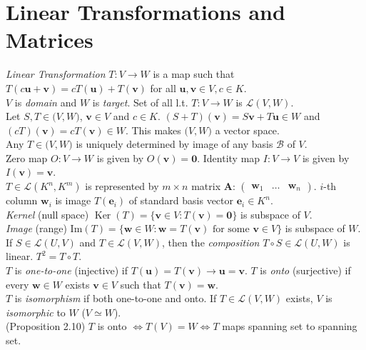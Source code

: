 \documentclass{article}
\theoremstyle{definition}
\DeclareMathOperator{\Ker}{Ker}
\renewcommand{\Im}{\text{Im}}
\begin{document}
\section{Linear Transformations and Matrices}
\textit{Linear Transformation} $T:V\rightarrow W$ is a map such that $T(c\mathbf{u}+\mathbf{v})=cT(\mathbf{u})+T(\mathbf{v})$ for all $\mathbf{u},\mathbf{v}\in V,c\in K$.\\
$V$ is \textit{domain} and $W$ is \textit{target}. Set of all l.t. $T:V\rightarrow W$ is $\mathscr{L}(V,W)$.\\
Let $S,T\in\mathscr(V,W)$, $\mathbf{v}\in V$ and $c\in K$. $(S+T)(\mathbf{v})=S\mathbf{v}+T\mathbf{u}\in W$ and $(cT)(\mathbf{v})=cT(\mathbf{v})\in W$. This makes $\mathscr(V,W)$ a vector space.\\
Any $T\in\mathscr(V,W)$ is uniquely determined by image of any basis $\mathcal{B}$ of $V$.\\
Zero map $O:V\rightarrow W$ is given by $O(\mathbf{v})=\mathbf{0}$. Identity map $I:V\rightarrow V$ is given by $I(\mathbf{v})=\mathbf{v}$.\\
$T\in\mathscr{L}(K^{n},K^{m})$ is represented by $m\times n$ matrix $\mathbf{A}$: $\begin{pmatrix}
    \mathbf{w}_{1} & \hdots & \mathbf{w}_{n}
\end{pmatrix}$. $i$-th column $\mathbf{w}_{i}$ is image $T(\mathbf{e}_{i})$ of standard basis vector $\mathbf{e}_{i}\in K^{n}$.\\
\textit{Kernel} (null space) $\Ker(T)=\{\mathbf{v}\in V:T(\mathbf{v})=\mathbf{0}\}$ is subspace of $V$.\\
\textit{Image} (range) $\Im(T)=\{\mathbf{w}\in W:\mathbf{w}=T(\mathbf{v})\text{ for some }\mathbf{v}\in V\}$ is subspace of $W$.\\
If $S\in\mathscr{L}(U,V)$ and $T\in\mathscr{L}(V,W)$, then the \textit{composition} $T\circ S\in\mathscr{L}(U,W)$ is linear. $T^{2}=T\circ T$.\\
$T$ is \textit{one-to-one} (injective) if $T(\mathbf{u})=T(\mathbf{v})\rightarrow\mathbf{u}=\mathbf{v}$. $T$ is \textit{onto} (surjective) if every $\mathbf{w}\in W$ exists $\mathbf{v}\in V$ such that $T(\mathbf{v})=\mathbf{w}$.\\
$T$ is \textit{isomorphism} if both one-to-one and onto. If $T\in\mathscr{L}(V,W)$ exists, $V$ is \textit{isomorphic} to $W$ ($V\simeq W$).\\
(Proposition 2.10) $T$ is onto $\Leftrightarrow T(V)=W\Leftrightarrow T$ maps spanning set to spanning set.\\
\end{document}
